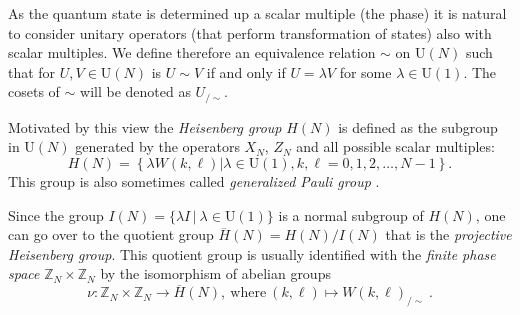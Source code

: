 \documentclass[10pt]{amsart}
\theoremstyle{plain}
\theoremstyle{definition}
\theoremstyle{remark}%
\newcommand{\Z}{\mathbb{Z}}
\newcommand{\set}[2]{\{#1\,|\ #2\}}
\newcommand{\C}{\mathbb{C}}
\newcommand{\U}{\mathrm{U}}
\begin{document}
% 

As the quantum state is determined up a scalar multiple (the phase) it is natural to consider unitary operators (that perform transformation of states) also with scalar multiples. We define therefore an  equivalence relation $\sim$ on $\U(N)$ such that for $U,V\in \U(N)$ is $U\sim V$ if and only if $U=\lambda V$ for some $\lambda\in \U(1)$. The cosets of $\sim$ will be denoted as $U_{/\sim}$.

Motivated by this view the \textit{Heisenberg group} $H(N)$ is defined as the subgroup in $\U(N)$ generated by the operators 
$X_N$, $Z_N$ and all possible scalar multiples:
\begin{equation}
H(N)= \left\lbrace \lambda W(k,\ell) |
\lambda\in \U(1), k,\ell = 0,1,2,\ldots,N-1\right\rbrace.
\end{equation}
This group is also sometimes called \emph{generalized Pauli group} \cite{appleby}.

Since the group $I(N)=\set{\lambda I}{\lambda\in \U(1)}$ is a normal subgroup of $H(N)$, one can go over to the
 quotient group
$\overline{H}(N)=H(N)/I(N)$ that is the \emph{projective Heisenberg group}.
This quotient group is usually identified with the 
\textit{finite phase space} $\mathbb{Z}_N \times \mathbb{Z}_N$
by the isomorphism of abelian groups $$\nu:\Z_N \times \Z_N \rightarrow \overline{H}(N),\ \text{where}\ (k,\ell)\mapsto W(k,\ell)_{/\sim}\ .$$

\end{document}
